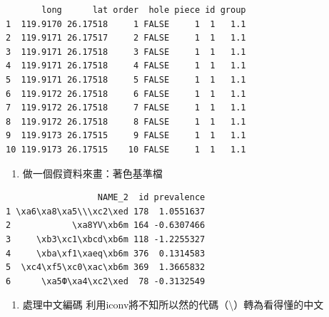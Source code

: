 \documentclass[]{book}
\newenvironment{Shaded}{\begin{snugshade}}{\end{snugshade}}
\newcommand{\KeywordTok}[1]{\textcolor[rgb]{0.13,0.29,0.53}{\textbf{{#1}}}}
\newcommand{\DataTypeTok}[1]{\textcolor[rgb]{0.13,0.29,0.53}{{#1}}}
\newcommand{\DecValTok}[1]{\textcolor[rgb]{0.00,0.00,0.81}{{#1}}}
\newcommand{\StringTok}[1]{\textcolor[rgb]{0.31,0.60,0.02}{{#1}}}
\newcommand{\CommentTok}[1]{\textcolor[rgb]{0.56,0.35,0.01}{\textit{{#1}}}}
\newcommand{\NormalTok}[1]{{#1}}
\providecommand{\tightlist}{%
  \setlength{\itemsep}{0pt}\setlength{\parskip}{0pt}}
\theoremstyle{definition}
\theoremstyle{definition}
\theoremstyle{remark}
\begin{document}
\begin{verbatim}
       long      lat order  hole piece id group
1  119.9170 26.17518     1 FALSE     1  1   1.1
2  119.9171 26.17517     2 FALSE     1  1   1.1
3  119.9171 26.17518     3 FALSE     1  1   1.1
4  119.9171 26.17518     4 FALSE     1  1   1.1
5  119.9171 26.17518     5 FALSE     1  1   1.1
6  119.9172 26.17518     6 FALSE     1  1   1.1
7  119.9172 26.17518     7 FALSE     1  1   1.1
8  119.9172 26.17518     8 FALSE     1  1   1.1
9  119.9173 26.17515     9 FALSE     1  1   1.1
10 119.9173 26.17515    10 FALSE     1  1   1.1
\end{verbatim}

\begin{enumerate}
\def\labelenumi{\arabic{enumi}.}
\setcounter{enumi}{1}
\tightlist
\item
  做一個假資料來畫：著色基準檔
\end{enumerate}

\begin{Shaded}
\end{Shaded}

\begin{verbatim}
                  NAME_2  id prevalence
1 \xa6\xa8\xa5\\\xc2\xed 178  1.0551637
2            \xa8ΥV\xb6m 164 -0.6307466
3     \xb3\xc1\xbcd\xb6m 118 -1.2255327
4     \xba\xf1\xaeq\xb6m 376  0.1314583
5  \xc4\xf5\xc0\xac\xb6m 369  1.3665832
6      \xa5Ф\xa4\xc2\xed  78 -0.3132549
\end{verbatim}

\begin{enumerate}
\def\labelenumi{\arabic{enumi}.}
\setcounter{enumi}{2}
\tightlist
\item
  處理中文編碼
  利用iconv將不知所以然的代碼（\textbackslash{}\xed）轉為看得懂的中文
\end{enumerate}

\begin{Shaded}
\end{Shaded}
\end{document}
